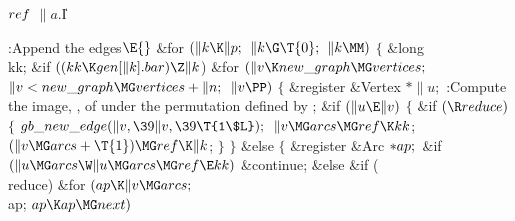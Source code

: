 \Y\B\4\D$\\{ref}$ \5
$\|a.{}$\|I\par
\Y\B\4:Append the edges\X${}\E{}$\6
\&{for} ${}(\|k\K\|p;{}$ ${}\|k\G\T{0};{}$ ${}\|k\MM){}$\5
${}\{{}$\5
\1\&{long} \\{kk};\7
\&{if} ${}((\\{kk}\K\\{gen}[\|k].\\{bar})\Z\|k{}$)\1\6
\&{for} ${}(\|v\K\\{new\_graph}\MG\\{vertices};{}$ ${}\|v<\\{new\_graph}\MG%
\\{vertices}+\|n;{}$ ${}\|v\PP){}$\5
${}\{{}$\1\6
\&{register} \&{Vertex} ${}{*}\|u;{}$\7
:Compute the image, , of  under the permutation defined by %
\X;\6
\&{if} ${}(\|u\E\|v){}$\5
${}\{{}$\1\6
\&{if} ${}(\R\\{reduce}){}$\5
${}\{{}$\1\6
${}\\{gb\_new\_edge}(\|v,\39\|v,\39\T{1\$L});{}$\6
${}\|v\MG\\{arcs}\MG\\{ref}\K\\{kk}{}$;\5
${}(\|v\MG\\{arcs}+\T{1})\MG\\{ref}\K\|k{}$;\6
\4${}\}{}$\2\6
\4${}\}{}$\5
\2\&{else}\5
${}\{{}$\5
\1\&{register} \&{Arc} ${}{*}\\{ap};{}$\7
\&{if} ${}(\|u\MG\\{arcs}\W\|u\MG\\{arcs}\MG\\{ref}\E\\{kk}){}$\1\5
\&{continue};\2\6
\&{else} \&{if} (\\{reduce})\1\6
\&{for} ${}(\\{ap}\K\|v\MG\\{arcs};{}$ \\{ap}; ${}\\{ap}\K\\{ap}\MG\\{next}){}$%
